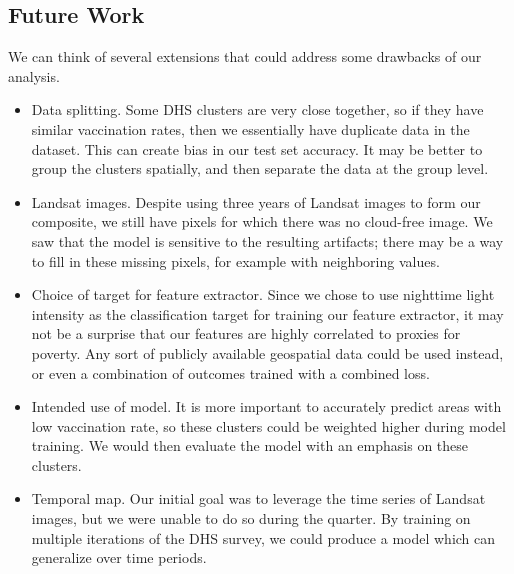 \documentclass[]{article}
\begin{document}
\subsection{Future Work}
We can think of several extensions that could address some drawbacks of our analysis. 
\begin{itemize}
\item Data splitting. Some DHS clusters are very close together, so if they have similar vaccination rates, then we essentially have duplicate data in the dataset. This can create bias in our test set accuracy. It may be better to group the clusters spatially, and then separate the data at the group level.
\item Landsat images. Despite using three years of Landsat images to form our composite, we still have pixels for which there was no cloud-free image. We saw that the model is sensitive to the resulting artifacts; there may be a way to fill in these missing pixels, for example with neighboring values.
\item Choice of target for feature extractor. Since we chose to use nighttime light intensity as the classification target for training our feature extractor, it may not be a surprise that our features are highly correlated to proxies for poverty. Any sort of publicly available geospatial data could be used instead, or even a combination of outcomes trained with a combined loss.
\item Intended use of model. It is more important to accurately predict areas with low vaccination rate, so these clusters could be weighted higher during model training. We would then evaluate the model with an emphasis on these clusters.
\item Temporal map. Our initial goal was to leverage the time series of Landsat images, but we were unable to do so during the quarter. By training on multiple iterations of the DHS survey, we could produce a model which can generalize over time periods.
\end{itemize}


{}

\end{document}
